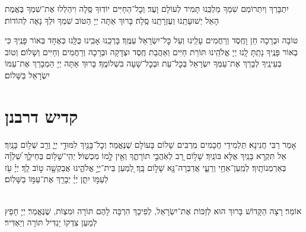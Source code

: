\documentclass[twoside, openany, parskip=half, 11pt]{book}
\begin{document}
\nextpage

יִתְבָּרַךְ וְיִתְרוֹמַם שִׁמְךָ מַלְכֵּֽנוּ תָּמִיד לְעוֹלָם וָעֶד׃
וְכׇל־הַחַיִּים יוֹדֽוּךָ סֶּֽלָה וִיהַלְלוּ אֶת־שִׁמְךָ בֶּאֱמֶת הָאֵל יְשׁוּעָתֵֽנוּ וְעֶזְרָתֵֽנוּ סֶֽלָה׃ בָּרוּךְ אַתָּה יְיָ הַטּוֹב שִׁמְךָ וּלְךָ נָאֶה לְהוֹדוֹת׃

\shatzbrikaskohanim

טוֹבָה וּבְרָכָה חֵן וָחֶֽסֶד וְרַחֲמִים עָלֵֽינוּ וְעַל כׇּל־יִשְׂרָאֵל עַמֶּֽךָ׃ בָּרְכֵֽנוּ אָבִֽינוּ כֻּלָּֽנוּ כְּאֶחָד בְּאוֹר פָּנֶֽיךָ כִּי בְאוֹר פָּנֶֽיךָ נָתַֽתָּ לָֽנוּ יְיָ אֱלֹהֵֽינוּ תּוֹרַת חַיִּים וְאַהֲבַת חֶֽסֶד וּצְדָקָה וּבְרָכָה וְרַחֲמִים וְחַיִּים וְשָׁלוֹם׃ וְטוֹב בְּעֵינֶֽיךָ לְבָרֵךְ אֶת־עַמְּךָ יִשְׂרָאֵל בְּכׇל־עֵת וּבְכׇל־שָׁעָה בִּשְׁלוֹמֶֽךָ׃ בָּרוּךְ אַתָּה יְיָ הַמְבָרֵךְ אֶת־עַמּוֹ יִשְׂרָאֵל בַּשָּׁלוֹם׃

\tachanunim

\vfill


\sepline


\chapter[קדיש דרבנן]{ קדיש דרבנן }
\label{kaddish derabonan}


אָמַר רַבִּי חֲנִינָא׃ תַּלְמִידֵי חֲכָמִים מַרְבִּים שָׁלוֹם בָּעוֹלָם שֶׁנֶּאֱמַר׃ וְכׇל־בָּנַ֖יִךְ לִמּוּדֵ֣י יְיָ֑ וְרַ֖ב שְׁל֥וֹם בָּנָֽיִךְ׃ אַל תִּקְרָא בָּנַֽיִךְ אֶלָּא בּוֹנַֽיִךְ׃ שָׁל֣וֹם רָ֭ב לְאֹֽהֲבֵ֣י תוֹרָתֶ֑ךָ וְאֵ֖ין לָ֣מוֹ מִכְשֽׁוֹל׃ יְהִֽי־שָׁל֥וֹם בְּחֵילֵ֑ךְ שַׁ֝לְוָ֗ה בְּאַרְמְנוֹתָֽיִךְ׃ לְמַֽעַן־אַחַ֥י וְרֵעָ֑י אֲדַבְּרָה־נָּ֖א שָׁל֣וֹם בָּֽךְ׃ לְ֭מַעַן בֵּית־יְיָ֣ אֱלֹהֵ֑ינוּ אֲבַקְשָׁ֖ה ט֣וֹב לָֽךְ׃ יְיָ֗ עֹ֖ז לְעַמּ֣וֹ יִתֵּ֑ן יְיָ֓ יְבָרֵ֖ךְ אֶת־עַמּ֣וֹ בַשָּׁלֽוֹם׃

\\
אוֹמֵר׃ רָצָה הַקָּדוֹשׁ בָּרוּךְ הוּא לְזַכּוֹת אֶת־יִשְׂרָאֵל, לְפִיכָךְ הִרְבָּה לָהֶם תּוֹרָה וּמִצְוֹת, שֶׁנֶּאֱמַר׃
יְיָ חָפֵץ לְמַעַן צִדְקוֹ יַגְדִּיל תּוֹרָה וְיַאְדִּיר׃


\begin{kaddish}

\rabbiskaddish
\end{kaddish}
\end{document}
